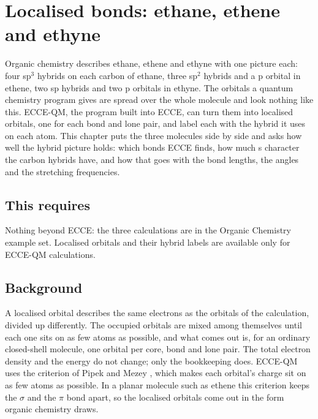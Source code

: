 \chapter{Localised bonds: ethane, ethene and ethyne}
\label{ch:localised-bonds}

Organic chemistry describes ethane, ethene and ethyne with one picture each: four sp$^3$ hybrids on each carbon of ethane, three sp$^2$ hybrids and a p orbital in ethene, two sp hybrids and two p orbitals in ethyne. The orbitals a quantum chemistry program gives are spread over the whole molecule and look nothing like this. ECCE-QM, the program built into ECCE, can turn them into localised orbitals, one for each bond and lone pair, and label each with the hybrid it uses on each atom. This chapter puts the three molecules side by side and asks how well the hybrid picture holds: which bonds ECCE finds, how much s character the carbon hybrids have, and how that goes with the bond lengths, the angles and the stretching frequencies.

\section*{This requires}
Nothing beyond ECCE: the three calculations are in the Organic Chemistry example set. Localised orbitals and their hybrid labels are available only for ECCE-QM calculations.

\section{Background}
A localised orbital describes the same electrons as the orbitals of the calculation, divided up differently. The occupied orbitals are mixed among themselves until each one sits on as few atoms as possible, and what comes out is, for an ordinary closed-shell molecule, one orbital per core, bond and lone pair. The total electron density and the energy do not change; only the bookkeeping does. ECCE-QM uses the criterion of Pipek and Mezey \cite{pipek1989}, which makes each orbital's charge sit on as few atoms as possible. In a planar molecule such as ethene this criterion keeps the $\sigma$ and the $\pi$ bond apart, so the localised orbitals come out in the form organic chemistry draws.


